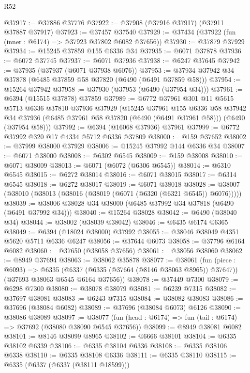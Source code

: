 \begin{lexlean}{R52}
\begin{coremodule}
@37917 := @37886 @37776
@37922 := @37908 (@37916 @37917) (@37911 @37887 @37917)
@37923 := @37457 @37540
@37929 := @37434 (@37922 (fun (inner : @6174) => @37923 @37802 @6082 @37656))
@37930 := @37879 @37929
@37934 := @15245 @37859 @155 @6336 @34
@37935 := @6071 @37878
@37936 := @6072 @37745
@37937 := @6071 @37936
@37938 := @6247 @37645
@37942 := @37935 (@37937 (@6071 @37938 @6076))
@37953 := @37934 @37942 @34 @37878 (@6485 @37859 @58 @37820 (@6490 (@6491 @37859 @58)))
@37954 := @15264 @37942
@37958 := @37930 (@37953 (@6490 (@37954 @34)))
@37961 := @6394 (@15515 @37878) @37859
@37989 := @6772
    @37961
    @301
    @11
    @5615
    @5713
    @6336
    @37810
    @37936
    @37929
    (@15245
      @37961
      @155
      @6336
      @58
      @37942
      @34
      @37936
      (@6485 @37961 @58 @37820 (@6490 (@6491 @37961 @58)))
      (@6490 (@37954 @58)))
@37992 := @6394 (@16068 @37936) @37961
@37999 := @6772 @37992 @320 @17 @4334 @5712 @6336 @37809
@38000 := @159 @37652
@38002 := @37999 @38000 @37929
@38006 := @15245 @37992 @144 @6336 @34
@38007 := @6071 @38000
@38008 := @6302 @6545
@38009 := @159 @38008
@38010 := @6071 @38009
@38013 := @6071 (@6072 (@6306 @6545))
@38014 := @6310 @6545
@38015 := @6272 @38014
@38016 := @6071 @38015
@38017 := @6314 @6545
@38018 := @6272 @38017
@38019 := @6071 @38018
@38028 := @38007 (@38010 (@38013 (@38016 (@38019 (@6071 (@6320 (@6321 @6545)) @6076)))))
@38039 := @38006 @38028 @34 @38000 (@6485 @37992 @34 @37818 (@6490 (@6491 @37992 @34)))
@38040 := @15264 @38028
@38042 := @6490 (@38040 @34)
@38044 := @38002 (@38039 @38042)
@38046 := @6435 @6174 @6365
@38049 := @6394 (@18024 @38000) @37992
@38055 := @38046 @38049 @4351 @5620 @5711 @6336 @6247
@38056 := @37644 @6073
@38058 := @37796 @6164 @6082
@38060 := @37650 (@38058 @37656)
@38061 := @38056 @38060
@38062 := @8949 @37694
@38063 := @38062 @35878
@38077 := @38061
    (fun (piece : @6093) =>
    @6335 (@6337 (@6335 (@37664 (@8146 @38063 @8965)) @37647)) (@37693 @38063 @6545 @6164 @37656))
@38078 := @37449 @7300
@38079 := @6298 @7300
@38080 := @38078 @38079
@38081 := @6239 @7315
@38082 := @37697 @38081
@38083 := @6243 @7315
@38084 := @38082 @38083
@38086 := @37696 (@38084 @6082)
@38089 := @37696 (@38084 @6073) @6126
@38090 := @38086 @38089
@38097 := @38077 (fun (head : @6174) => fun (tail : @6174) => @37692 (@38080 @38090 @6545 @37656))
@38099 := @8949 @38081 @6082
@38101 := @8146 @38099 @8965
@38102 := @6666 @38101
@38104 := @6335 @38102 @6339
@38106 := @6335 @38104 @6336
@38108 := @6335 @38106 @6338
@38110 := @6335 @38108 @6336
@38111 := @6335 @38110
@38115 := @6335 (@6337 (@6337 (@38111 @18599)))

\end{coremodule}
\end{lexlean}
